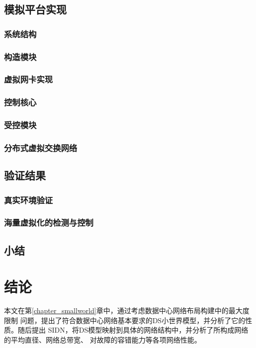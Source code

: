 \documentclass[master]{njuthesis}
\begin{document}
\section{模拟平台实现}
\Blindtext
\subsection{系统结构}
\Blindtext
\subsection{构造模块}
\Blindtext
\subsection{虚拟网卡实现}
\Blindtext
\subsection{控制核心}
\Blindtext
\subsection{受控模块}
\Blindtext
\subsection{分布式虚拟交换网络}
\Blindtext
\section{验证结果}
\Blindtext
\subsection{真实环境验证}
\Blindtext
\subsection{海量虚拟化的检测与控制}
\Blindtext
\section{小结}
\blindtext

\chapter{结论}\label{chapter_concludes}

本文在第\ref{chapter_smallworld}章中，通过考虑数据中心网络布局构建中的最大度限制
问题，提出了符合数据中心网络基本要求的DS小世界模型，并分析了它的性质。随后提出
SIDN，将DS模型映射到具体的网络结构中，并分析了所构成网络的平均直径、网络总带宽、
对故障的容错能力等各项网络性能。
\end{document}
